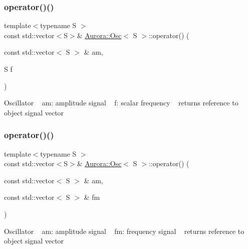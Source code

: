 \subsubsection{\texorpdfstring{operator()()}{operator()()}\hspace{0.1cm}{\footnotesize\ttfamily [3/4]}}
{\footnotesize\ttfamily template$<$typename S $>$ \\
const std\+::vector$<$S$>$\& \hyperlink{class_aurora_1_1_osc}{Aurora\+::\+Osc}$<$ S $>$\+::operator() (\begin{DoxyParamCaption}\item[{const std\+::vector$<$ S $>$ \&}]{am,  }\item[{S}]{f }\end{DoxyParamCaption})\hspace{0.3cm}{\ttfamily [inline]}}

Oscillator ~\newline
am\+: amplitude signal ~\newline
f\+: scalar frequency ~\newline
returns reference to object signal vector \mbox{\label{class_aurora_1_1_osc_a06f9ead5fbf828f7ebb8617ac6cb24b4}} 
\subsubsection{\texorpdfstring{operator()()}{operator()()}\hspace{0.1cm}{\footnotesize\ttfamily [4/4]}}
{\footnotesize\ttfamily template$<$typename S $>$ \\
const std\+::vector$<$S$>$\& \hyperlink{class_aurora_1_1_osc}{Aurora\+::\+Osc}$<$ S $>$\+::operator() (\begin{DoxyParamCaption}\item[{const std\+::vector$<$ S $>$ \&}]{am,  }\item[{const std\+::vector$<$ S $>$ \&}]{fm }\end{DoxyParamCaption})\hspace{0.3cm}{\ttfamily [inline]}}

Oscillator ~\newline
am\+: amplitude signal ~\newline
fm\+: frequency signal ~\newline
returns reference to object signal vector \mbox{\label{class_aurora_1_1_osc_a4e01fb1238c931c944b6b27c3790495e}} 
